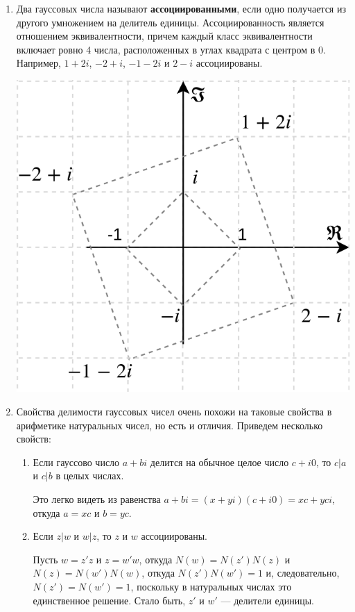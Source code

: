\begin{enumerate}
\item Два гауссовых числа называют \textbf{ассоциированными}, если одно получается из другого умножением на делитель единицы. Ассоциированность является отношением эквивалентности, причем каждый класс эквивалентности включает ровно 4 числа, расположенных в углах квадрата с центром в 0. Например, $1+2i$, $-2+i$, $-1-2i$ и $2-i$ ассоциированы.
\begin{center}
\includegraphics[scale=0.35]{Gaussian.png}
\end{center}

\item Свойства делимости гауссовых чисел очень похожи на таковые свойства в арифметике натуральных чисел, но есть и отличия.
Приведем несколько свойств:
\begin{enumerate}
\item Если гауссово число $a+bi$ делится на обычное целое число $c+i0$, то $c|a$ и $c|b$ в целых числах.

Это легко видеть из равенства $a+bi=(x+yi)(c+i0)=xc+yci$, откуда $a=xc$ и $b=yc$.
\item Если $z|w$ и $w|z$, то $z$ и $w$ ассоциированы.

Пусть $w=z'z$ и $z=w'w$, откуда $N(w)=N(z')N(z)$ и $N(z)=N(w')N(w)$, откуда $N(z')N(w')=1$ и, следовательно, $N(z')=N(w')=1$, поскольку в натуральных числах это единственное решение. Стало быть, $z'$ и $w'$ --- делители единицы.


\end{enumerate}
\end{enumerate}
